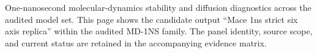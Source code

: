 One-nanosecond molecular-dynamics stability and diffusion diagnostics across the audited model set. This page shows the candidate output ``Mace 1ns strict six axis replica'' within the audited MD-1NS family. The panel identity, source scope, and current status are retained in the accompanying evidence matrix.
